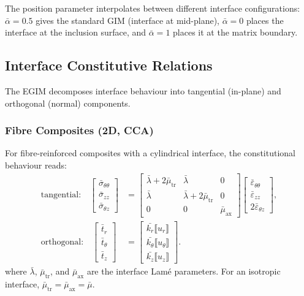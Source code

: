 \documentclass[oneside, 12pt, a4paper, bibliography=totoc]{book}
\newcommand{\jump}[1]{\llbracket #1 \rrbracket}    %
\begin{document}
The position parameter interpolates between different interface configurations: $\bar{\alpha} = 0.5$ gives the standard GIM (interface at mid-plane), $\bar{\alpha} = 0$ places the interface at the inclusion surface, and $\bar{\alpha} = 1$ places it at the matrix boundary.

\subsection{Interface Constitutive Relations}
\label{subsec:interface_constitutive_relations}

The EGIM decomposes interface behaviour into tangential (in-plane) and orthogonal (normal) components.

\subsubsection{Fibre Composites (2D, CCA)}

For fibre-reinforced composites with a cylindrical interface, the constitutional behaviour reads:
%
\begin{equation}
\begin{aligned}
\text{tangential:}\quad
\begin{bmatrix}
\bar{\sigma}_{\theta\theta} \\
\bar{\sigma}_{zz} \\
\bar{\sigma}_{\theta z}
\end{bmatrix}
&=
\begin{bmatrix}
\bar{\lambda} + 2\bar{\mu}_{\text{tr}} & \bar{\lambda} & 0 \\
\bar{\lambda} & \bar{\lambda} + 2\bar{\mu}_{\text{tr}} & 0 \\
0 & 0 & \bar{\mu}_{\text{ax}}
\end{bmatrix}
\begin{bmatrix}
\bar{\varepsilon}_{\theta\theta} \\
\bar{\varepsilon}_{zz} \\
2\bar{\varepsilon}_{\theta z}
\end{bmatrix},
\\[10pt]
\text{orthogonal:}\quad
\begin{bmatrix}
\bar{t}_r \\
\bar{t}_\theta \\
\bar{t}_z
\end{bmatrix}
&=
\begin{bmatrix}
\bar{k_r} \jump{u_r} \\
\bar{k_\theta} \jump{u_\theta} \\
\bar{k_z} \jump{u_z}
\end{bmatrix}.
\end{aligned}
\label{eq:interface_combined}
\end{equation}
where $\bar{\lambda}$, $\bar{\mu}_{\text{tr}}$, and $\bar{\mu}_{\text{ax}}$ are the interface Lam\'{e} parameters. For an isotropic interface, $\bar{\mu}_{\text{tr}} = \bar{\mu}_{\text{ax}} = \bar{\mu}$.
\end{document}
